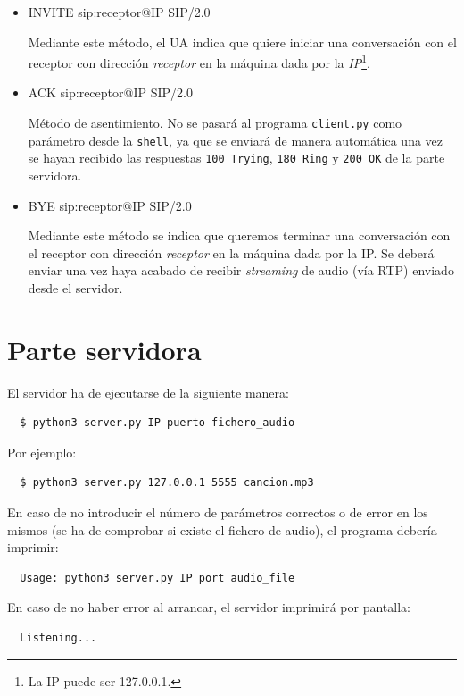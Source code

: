 \documentclass[a4paper,11pt]{article}
\begin{document}
  \begin{itemize}
    \item INVITE sip:receptor@IP SIP/2.0

    Mediante este método, el UA indica que quiere iniciar una conversación con el receptor con dirección \emph{receptor} en la máquina dada por la \emph{IP}\footnote{La IP puede ser 127.0.0.1.}.

    \item ACK sip:receptor@IP SIP/2.0

    Método de asentimiento. No se pasará al programa \texttt{client.py} como parámetro desde
la \texttt{shell}, ya que se enviará de manera automática una vez se hayan recibido las respuestas \texttt {100 Trying}, \texttt{180 Ring} y \texttt{200 OK} de la parte servidora.

    \item BYE sip:receptor@IP SIP/2.0

    Mediante este método se indica que queremos terminar una conversación con el receptor con dirección \emph{receptor} en la máquina dada por la IP. Se deberá enviar una vez haya acabado de recibir \emph{streaming} de audio (vía RTP) enviado desde el servidor.

  \end{itemize}


\section*{Parte servidora}

El servidor ha de ejecutarse de la siguiente manera:
\begin{verbatim}
  $ python3 server.py IP puerto fichero_audio
\end{verbatim}

Por ejemplo:
\begin{verbatim}
  $ python3 server.py 127.0.0.1 5555 cancion.mp3
\end{verbatim}

En caso de no introducir el número de parámetros correctos o de error en los mismos (se ha de comprobar si existe el fichero de audio), el programa debería imprimir:
\begin{verbatim}
  Usage: python3 server.py IP port audio_file
\end{verbatim}

En caso de no haber error al arrancar, el servidor imprimirá por pantalla:
\begin{verbatim}
  Listening...
\end{verbatim}
\end{document}
